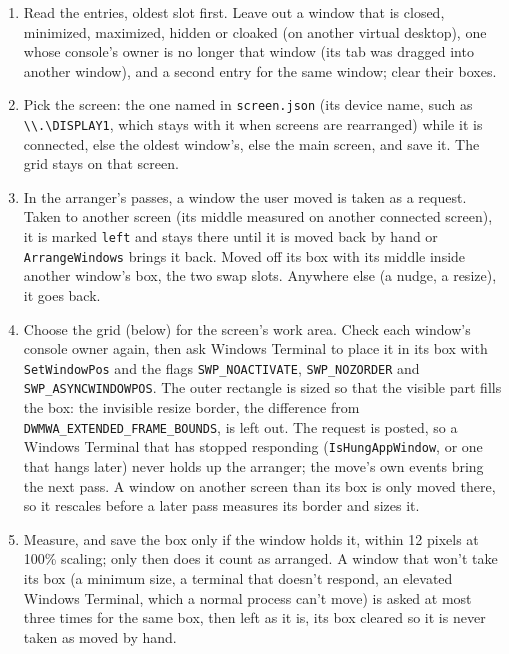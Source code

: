 \documentclass[10pt,a4paper]{article}
\newcommand{\code}[1]{\texttt{#1}}
\begin{document}
\begin{enumerate}
  \item Read the entries, oldest slot first. Leave out a window that is closed, minimized,
        maximized, hidden or cloaked (on another virtual desktop), one whose console's owner is no
        longer that window (its tab was dragged into another window), and a second entry for the
        same window; clear their boxes.
  \item Pick the screen: the one named in \code{screen.json} (its device name, such as
        \code{\textbackslash\textbackslash.\textbackslash{}DISPLAY1}, which stays with it when
        screens are rearranged) while it is connected, else the oldest window's, else the main
        screen, and save it. The grid stays on that screen.
  \item In the arranger's passes, a window the user moved is taken as a request. Taken to another
        screen (its middle measured on another connected screen), it is marked \code{left} and stays there until it is moved back by hand or
        \code{ArrangeWindows} brings it back. Moved off its box with its middle inside another
        window's box, the two swap slots. Anywhere else (a nudge, a resize), it goes back.
  \item Choose the grid (below) for the screen's work area. Check each window's console owner
        again, then ask Windows Terminal to place it in its box with \code{SetWindowPos} and the
        flags \code{SWP\_NOACTIVATE}, \code{SWP\_NOZORDER} and \code{SWP\_ASYNCWINDOWPOS}. The
        outer rectangle is sized so that the visible part fills the box: the invisible resize
        border, the difference from \code{DWMWA\_EXTENDED\_FRAME\_BOUNDS}, is left out. The request is posted, so a
        Windows Terminal that has stopped responding (\code{IsHungAppWindow}, or one that
        hangs later) never holds up the arranger; the move's own events bring the next pass. A
        window on another screen than its box is only moved there, so it rescales before a later
        pass measures its border and sizes it.
  \item Measure, and save the box only if the window holds it, within 12 pixels at 100\%
        scaling; only then does it count as arranged. A window that won't take its box (a minimum
        size, a terminal that doesn't respond, an elevated Windows Terminal, which a normal process
        can't move) is asked at most three times for the same box, then left as it is, its box
        cleared so it is never taken as moved by hand.
\end{enumerate}
\end{document}
